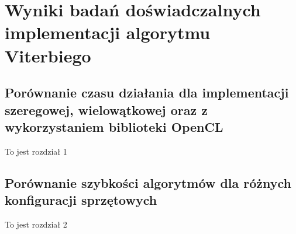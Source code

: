 \documentclass[document.tex]{subfiles}
\begin{document}
\chapter{Wyniki badań doświadczalnych implementacji algorytmu Viterbiego}
\section{Porównanie czasu działania dla implementacji szeregowej, wielowątkowej oraz z wykorzystaniem biblioteki OpenCL}
To jest rozdział 1

\section{Porównanie szybkości algorytmów dla różnych konfiguracji sprzętowych}
To jest rozdział 2
\end{document}

